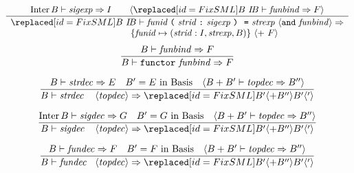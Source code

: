 %
\begin{equation}        %
\frac{
      \Inter\B\ts\sigexp\ra\I\qquad
      \langle\FIXREPL{\B\ }{\IB}\ts\funbind\ra\F\rangle
     }
     {
      \begin{array}{c}
       \FIXREPL{\B\ }{\IB}\ts\barefunstrbinder\ \optfunbinda\ra\\
       \qquad\qquad \qquad
              \{\funid\mapsto(\strid:\I,\strexp,\B)\}
              \ \langle +\ \F\rangle
      \end{array}
     }\index{62.5}
\end{equation}
\oldpagebreak
{}
\begin{equation}        %
\frac{ \B\ts\funbind\ra\F }
     { \B\ts\singfundec\ra\F }\index{63.1}
\end{equation}

\begin{equation}        %
\frac{\B\ts\strdec\ra\E\quad\B' =\E\ \In\ \Basis\quad\langle \B+\B'\ts\topdec\ra\B''\rangle }
     {\B\ts\strdecintopdec\ra\FIXREPL{\B'\langle+\B''\rangle}{\B'\langle{}'\rangle}
     }\index{63.2}
\end{equation}

\vspace{6pt}
\begin{equation}        %
\frac{\Inter\B\ts\sigdec\ra\G\quad B' = \G\ \In\ \Basis\quad
       \langle \B + \B'\ts\topdec\ra\B''\rangle}
     {\B\ts\sigdecintopdec\ra \FIXREPL{\B'\langle+\B''\rangle}{\B'\langle{}'\rangle}
     }
\end{equation}

\vspace{6pt}
\begin{equation}        %
\frac{\B\ts\fundec\ra\F\quad \B' = \F\ \In\ \Basis\quad
       \langle \B + \B'\ts\topdec\ra\B''\rangle}
     {\B\ts\fundecintopdec\ra\FIXREPL{\B'\langle+\B''\rangle}{\B'\langle{}'\rangle}
     }
\end{equation}



